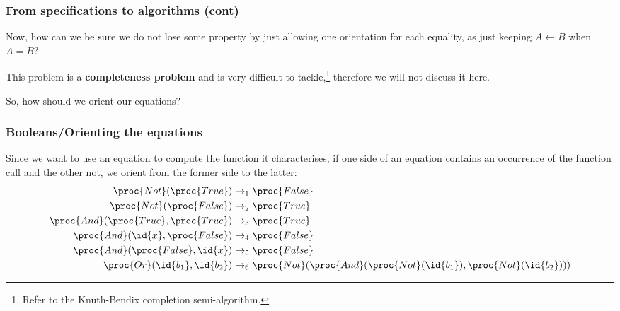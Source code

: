 %
\begin{frame}
\frametitle{From specifications to algorithms (cont)}

Now, how can we be sure we do not lose some property by just allowing
one orientation for each equality, as just keeping \(A \leftarrow
B\) when \(A = B\)?

\bigskip

This problem is a \textbf{completeness problem} and is very difficult
to tackle,\footnote{Refer to the Knuth-Bendix completion
  semi-algorithm.} therefore we will not discuss it here.

\bigskip

So, how should we orient our equations?

\end{frame}

%
\begin{frame}
\frametitle{Booleans/Orienting the equations}

Since we want to use an equation to compute the function it
characterises, if one side of an equation contains an occurrence of
the function call and the other not, we orient from the former side to
the latter:
\begin{align*}
\proc{Not} (\proc{True}) &\rightarrow_1 \proc{False}\\
\proc{Not} (\proc{False}) &\rightarrow_2 \proc{True}\\
\proc{And} (\proc{True}, \proc{True}) &\rightarrow_3 \proc{True}\\
\proc{And} (\id{x}, \proc{False}) &\rightarrow_4 \proc{False}\\
\proc{And} (\proc{False}, \id{x}) &\rightarrow_5 \proc{False}\\
\proc{Or} (\id{b_1}, \id{b_2}) &\rightarrow_6 \proc{Not} (\proc{And}
(\proc{Not} (\id{b_1}), \proc{Not} (\id{b_2})))
\end{align*}

\end{frame}


